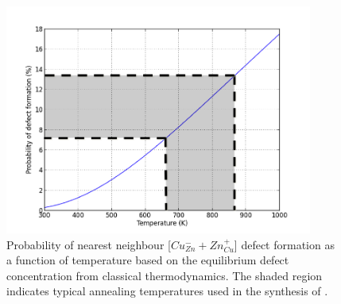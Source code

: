 \begin{figure}[h!]
  \centering
    \includegraphics[width=0.9\textwidth]{figures/Cu-Zn_eqm_conc.png}
    \caption{Probability of nearest neighbour [$Cu_{Zn}^- + Zn_{Cu}^+$] defect formation as a function of temperature based on the equilibrium defect concentration from classical thermodynamics. The shaded region indicates typical annealing temperatures used in the synthesis of {\CZTS}.}
  \label{Cu-Zn_eqm_conc}
\end{figure}
